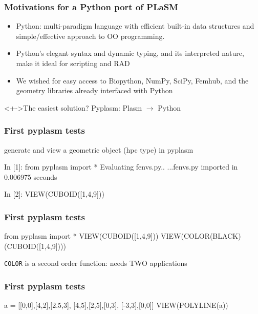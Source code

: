 \documentclass[ignorenonframetext,]{beamer}
\newcommand{\Alert}[1]{{\color{cyan}#1}}
\def\textbf#1{\alert{#1}}
\begin{document}
\begin{frame}\frametitle{Motivations for a Python port of PLaSM}

\begin{itemize}[<+->]
  \vfill \item Python: \Alert{multi-paradigm language} with efficient built-in data structures and simple/effective approach to OO programming.    
       
  \vfill \item Python's elegant syntax and dynamic typing, and its interpreted nature, make it ideal for \Alert{scripting} and \Alert{RAD}
      
  \vfill \item We wished for easy access to \Alert{Biopython}, \Alert{NumPy}, \Alert{SciPy}, \Alert{Femhub}, and the geometry libraries already interfaced with Python      
  \end{itemize}

\begin{alertblock}<+->{The easiest solution?}
   \Alert{Pyplasm}: Plasm $\rightarrow$ Python
\end{alertblock}

\end{frame}

\begin{frame}[fragile]\frametitle{First pyplasm tests}

generate and view a geometric object (hpc type) in pyplasm

\begin{python}
In [1]: from pyplasm import *
Evaluating fenvs.py..
...fenvs.py imported in 0.006975 seconds

In [2]: VIEW(CUBOID([1,4,9]))
\end{python}

\end{frame}

\begin{frame}[fragile]\frametitle{First pyplasm tests}

\begin{python}
from pyplasm import *
VIEW(CUBOID([1,4,9]))
VIEW(COLOR(BLACK)(CUBOID([1,4,9])))
\end{python}

\lstinline!COLOR! is a \textbf{second order function}: needs TWO
applications

\end{frame}

\begin{frame}[fragile]\frametitle{First pyplasm tests}

\begin{python}
a = [[0,0],[4,2],[2.5,3],
 [4,5],[2,5],[0,3],
 [-3,3],[0,0]]
VIEW(POLYLINE(a))
\end{python}

\end{frame}
\end{document}
